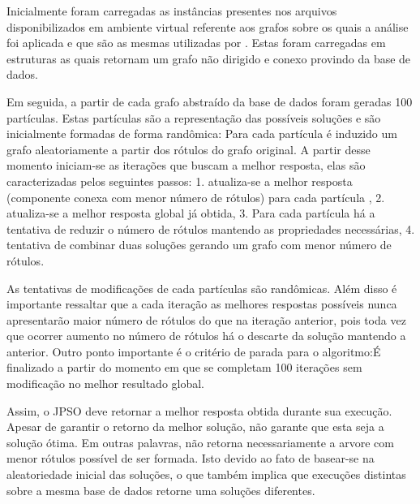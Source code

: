 \documentclass{sig-alternate-05-2015}
\begin{document}
Inicialmente foram carregadas as instâncias presentes nos arquivos disponibilizados em ambiente virtual referente aos grafos sobre os quais a análise foi aplicada e que são as  mesmas utilizadas por \cite{consoli2009greedy}. Estas foram carregadas em estruturas as quais retornam um grafo não dirigido e conexo provindo da base de dados. 
        
Em seguida, a partir de cada grafo abstraído da base de dados foram geradas 100 partículas. Estas partículas são a representação das possíveis soluções 
e são inicialmente formadas de forma randômica: Para cada partícula é induzido um grafo aleatoriamente a partir dos rótulos do grafo original. A partir desse momento iniciam-se as iterações que buscam a melhor resposta, elas são caracterizadas pelos seguintes passos: 1. atualiza-se a melhor resposta (componente conexa com menor número de rótulos) para cada partícula , 2. atualiza-se a melhor resposta global já obtida, 3. Para cada partícula há a tentativa de reduzir o número de rótulos mantendo as propriedades necessárias, 4. tentativa de combinar duas soluções gerando um grafo com menor número de rótulos.

As tentativas de modificações de cada partículas são randômicas. Além disso é importante ressaltar que a cada iteração as melhores respostas possíveis nunca apresentarão maior número de rótulos do que na iteração anterior, pois toda vez que ocorrer aumento no número de rótulos há o descarte da solução mantendo a anterior. Outro ponto importante é o critério de parada para o algoritmo:É finalizado a partir do momento em que se completam 100 iterações sem modificação no melhor resultado global.

Assim, o JPSO deve retornar a melhor resposta obtida durante sua execução. Apesar de garantir o retorno da melhor solução, não garante que esta seja a solução ótima. Em outras palavras, não retorna necessariamente a arvore com menor rótulos possível de ser formada. Isto devido ao fato de basear-se na aleatoriedade inicial das soluções, o que também implica que execuções distintas sobre a mesma base de dados retorne uma soluções diferentes.
\end{document}
